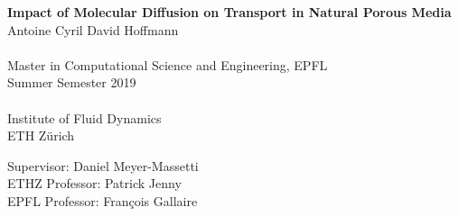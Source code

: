 \documentclass[smallheadings,headsepline,11pt,oneside,a4paper]{scrbook}
\begin{document}
\frontmatter							%


\begin{titlepage}
\begin{center}
    \vspace*{1cm}
    {\huge \bfseries  Impact of Molecular Diffusion on Transport in Natural Porous Media\\ }
    \vspace{2cm}
    {\large 
	Antoine Cyril David Hoffmann\\
	~\\
	Master in Computational Science and Engineering, EPFL\\
	\vspace{3.5cm}
	Summer Semester 2019\\
	~\\
	Institute of Fluid Dynamics\\
	ETH Zürich\\
    }




{\large
	Supervisor: Daniel Meyer-Massetti\\[\baselineskip]
	ETHZ Professor: Patrick Jenny\\[\baselineskip]
	EPFL Professor: François Gallaire
}
\end{center}

\vspace*{2cm} %

\end{titlepage}



\begin{titlepage}
\thispagestyle{empty}
\newpage
\mbox{}
\end{titlepage}





\end{document}
